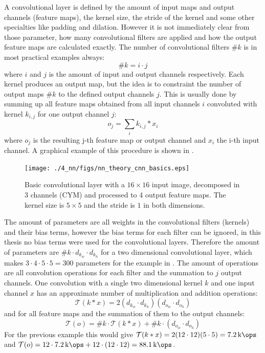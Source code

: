 A convolutional layer is defined by the amount of input maps and output channels (feature maps), the kernel size, the stride of the kernel and some other specialties like padding and dilation.
However it is not immediately clear from those parameter, how many convolutional filters are applied and how the output feature maps are calculated exactly.
The number of convolutional filters $\#k$ is in most practical examples always:
\begin{equation}\label{eq:nn_theory_n_filters}
  \#k = i \cdot j
\end{equation}
where $i$ and $j$ is the amount of input and output channels respectively.
Each kernel produces an output map, but the idea is to constraint the number of output maps $\#k$ to the defined output channels $j$.
This is usually done by summing up all feature maps obtained from all input channels $i$ convoluted with kernel $k_{i, j}$ for one output channel $j$:
\begin{equation}
  o_j = \sum_{i} k_{i, j} \ast x_i
\end{equation}
where $o_j$ is the resulting j-th feature map or output channel and $x_i$ the i-th input channel.
A graphical example of this procedure is shown in .
\begin{figure}[!ht]
  \centering
    \texttt{[image: ./4\_nn/figs/nn\_theory\_cnn\_basics.eps]}
  \caption{Basic convolutional layer with a $16 \times 16$ input image, decomposed in 3 channels (CYM) and processed to 4 output feature maps. The kernel size is $5 \times 5$ and the stride is $1$ in both dimensions.}
  \label{fig:nn_theory_cnn_basics}
\end{figure}
\FloatBarrier
\noindent

The amount of parameters are all weights in the convolutional filters (kernels) and their bias terms, however the bias terms for each filter can be ignored, in this thesis no bias terms were used for the convolutional layers.
Therefore the amount of parameters are $\#k \cdot d_{k_w} \cdot d_{k_h}$ for a two dimensional convolutional layer, which makes $3 \cdot 4 \cdot 5 \cdot 5 = 300$ parameters for the example in .
The amount of operations are all convolution operations for each filter and the summation to $j$ output channels.
One convolution with a single two dimensional kernel $k$ and one input channel $x$ has an approximate number of multiplication and addition operations:
\begin{equation}
  \mathcal{T}(k * x) = 2(d_{k_w} \cdot d_{k_h}) (d_{o_w} \cdot d_{o_h})
\end{equation}
and for all feature maps and the summation of them to the output channels:
\begin{equation}
  \mathcal{T}(o) = \#k \cdot \mathcal{T}(k * x) + \#k \cdot (d_{o_w} \cdot d_{o_h})
\end{equation}
For the previous example this would give $\mathcal{T}(k * x) = 2 (12 \cdot 12) (5 \cdot 5) = \SI{7.2}{\kilo\ops}$ and $\mathcal{T}(o) = 12 \cdot \SI{7.2}{\kilo\ops} + 12 \cdot (12 \cdot 12) = \SI{88.1}{\kilo\ops}$.


